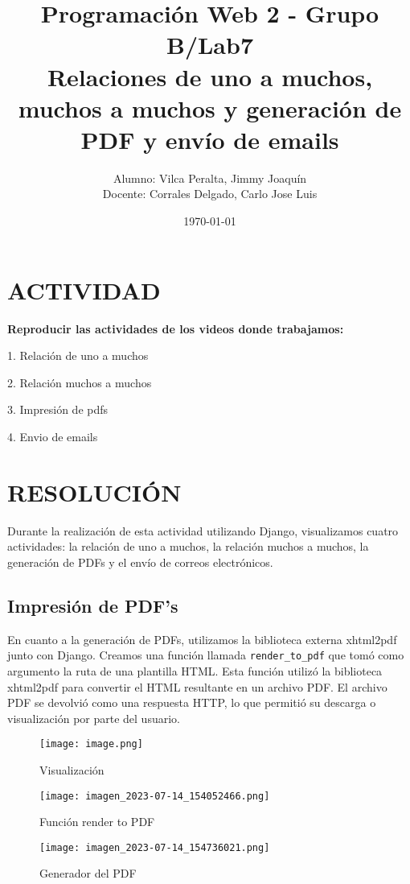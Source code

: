 \documentclass{article}
\title{Programación Web 2 - Grupo B/Lab7\\
Relaciones de uno a muchos, muchos a muchos y generación de PDF y envío de emails}
\author{
Alumno: Vilca Peralta, Jimmy Joaquín\\
Docente: Corrales Delgado, Carlo Jose Luis}
\date{\today}
\begin{document}
\maketitle

\section{ACTIVIDAD}

\textbf{Reproducir las actividades de los videos donde trabajamos:}

1. Relación de uno a muchos

2. Relación muchos a muchos

3. Impresión de pdfs 

4. Envio de emails

\section{RESOLUCIÓN}

Durante la realización de esta actividad utilizando Django, visualizamos cuatro actividades: la relación de uno a muchos, la relación muchos a muchos, la generación de PDFs y el envío de correos electrónicos.

\subsection{Impresión de PDF's}
En cuanto a la generación de PDFs, utilizamos la biblioteca externa xhtml2pdf junto con Django. Creamos una función llamada \texttt{render\_to\_pdf} que tomó como argumento la ruta de una plantilla HTML. Esta función utilizó la biblioteca xhtml2pdf para convertir el HTML resultante en un archivo PDF. El archivo PDF se devolvió como una respuesta HTTP, lo que permitió su descarga o visualización por parte del usuario.

\begin{figure}
    \centering
    \texttt{[image: image.png]}
    \caption{Visualización}
    \label{fig:enter-label}
\end{figure}
\begin{figure}
    \centering
    \texttt{[image: imagen\_2023-07-14\_154052466.png]}
    \caption{Función render to PDF}
    \label{fig:enter-label}
\end{figure}
\begin{figure}
    \centering
    \texttt{[image: imagen\_2023-07-14\_154736021.png]}
    \caption{Generador del PDF}
    \label{fig:enter-label}
\end{figure}
\end{document}
